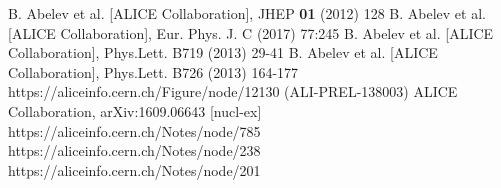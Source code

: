 \begin{thebibliography}{99}
 B. Abelev et al. [ALICE Collaboration], JHEP {\bf 01} (2012) 128
 B. Abelev et al. [ALICE Collaboration], Eur. Phys. J. C (2017) 77:245
 B. Abelev et al. [ALICE Collaboration], Phys.Lett. B719 (2013) 29-41
 B. Abelev et al. [ALICE Collaboration], Phys.Lett. B726 (2013) 164-177
 https://aliceinfo.cern.ch/Figure/node/12130 (ALI-PREL-138003)
 ALICE Collaboration, arXiv:1609.06643 [nucl-ex]
 https://aliceinfo.cern.ch/Notes/node/785
 https://aliceinfo.cern.ch/Notes/node/238
 https://aliceinfo.cern.ch/Notes/node/201
\end{thebibliography}
